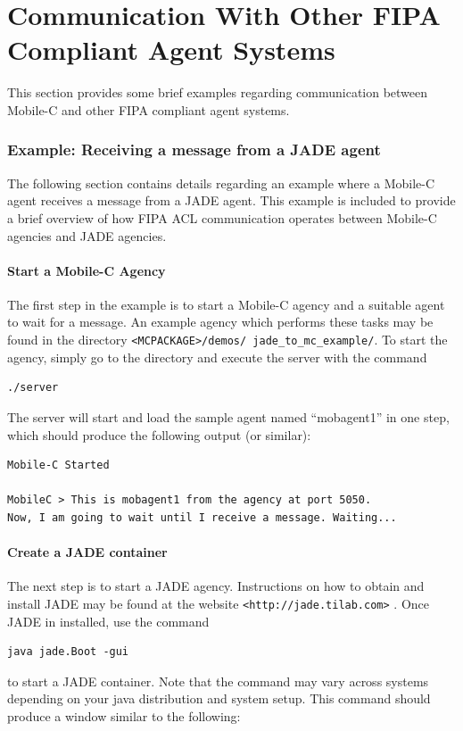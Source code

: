 \documentclass[11pt]{report}
\begin{document}
{%




\chapter{Communication With Other FIPA Compliant Agent Systems}
This section provides some brief examples regarding communication
between Mobile-C and other FIPA compliant agent systems.
\subsection{Example: Receiving a message from a JADE agent}
The following section contains details regarding an example where a
Mobile-C agent receives a message from a JADE agent. This example is
included to provide a brief overview of how FIPA ACL communication
operates between Mobile-C agencies and JADE agencies.

\subsubsection{Start a Mobile-C Agency}
The first step in the example is to start a Mobile-C agency and a suitable
agent to wait for a message. An example agency which performs these tasks
may be found in the directory \texttt{<MCPACKAGE>/demos/ jade\_to\_mc\_example/}.
To start the agency, simply go to the directory and execute the server
with the command
\begin{verbatim}
./server
\end{verbatim}
The server will start and load the sample agent named ``mobagent1'' in one step,
which should produce the following output (or similar):
\begin{verbatim}
Mobile-C Started

MobileC > This is mobagent1 from the agency at port 5050.
Now, I am going to wait until I receive a message. Waiting...
\end{verbatim}

\subsubsection{Create a JADE container}
The next step is to start a JADE agency. Instructions on how to obtain and
install JADE may be found at the website \texttt{<http://jade.tilab.com>} .
Once JADE in installed, use the command
\begin{verbatim}
java jade.Boot -gui
\end{verbatim}
to start a JADE container. Note that the command may vary across systems depending
on your java distribution and system setup. This command should produce a window
similar to the following:

}
\end{document}
